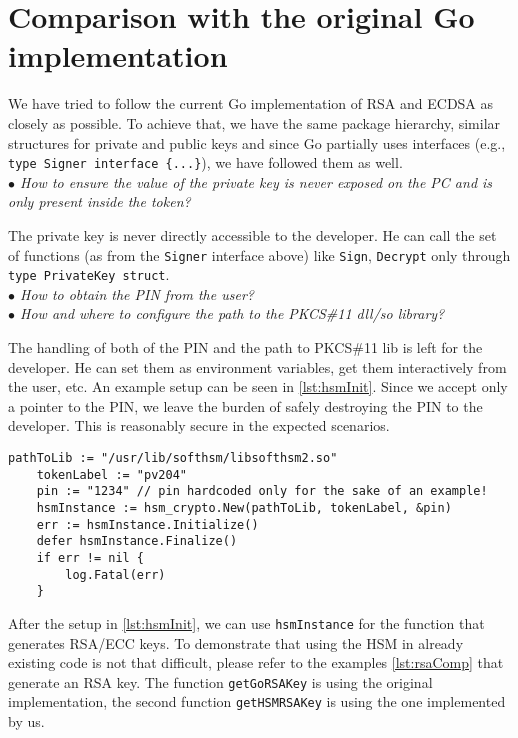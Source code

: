 \documentclass[a4paper]{scrartcl}
\begin{document}
\section{Comparison with the original Go implementation}
We have tried to follow the current Go implementation of RSA and ECDSA as closely as possible. To achieve that, we have the same package hierarchy, similar structures for private and public keys and since Go partially uses interfaces (e.g., \lstinline[columns=fixed]|type Signer interface {...}|), we have followed them as well.\\

\textit{$\bullet$ How to ensure the value of the private key is never exposed on the PC and is only present inside the token?}

The private key is never directly accessible to the developer. He can call the set of functions (as from the \lstinline[columns=fixed]{Signer} interface above) like \lstinline[columns=fixed]{Sign}, \lstinline[columns=fixed]{Decrypt} only through\\ \lstinline[columns=fixed]{type PrivateKey struct}.\\

\textit{$\bullet$ How to obtain the PIN from the user?}\\
\indent\textit{$\bullet$ How and where to configure the path to the PKCS\#11 dll/so library?}

The handling of both of the PIN and the path to PKCS\#11 lib is left for the developer. He can set them as environment variables, get them interactively from the user, etc. An example setup can be seen in \ref{lst:hsmInit}. Since we accept only a pointer to the PIN, we leave the burden of safely destroying the PIN to the developer. This is reasonably secure in the expected scenarios.

\begin{lstlisting}[caption=Comparison of the original and HSM implementations, captionpos=b, label={lst:hsmInit}]
    pathToLib := "/usr/lib/softhsm/libsofthsm2.so"
    tokenLabel := "pv204"
    pin := "1234" // pin hardcoded only for the sake of an example!
    hsmInstance := hsm_crypto.New(pathToLib, tokenLabel, &pin)
    err := hsmInstance.Initialize()
    defer hsmInstance.Finalize()
    if err != nil {
        log.Fatal(err)
    }
\end{lstlisting}

After the setup in \ref{lst:hsmInit}, we can use \lstinline[columns=fixed]{hsmInstance} for the function that generates RSA/ECC keys. To demonstrate that using the HSM in already existing code is not that difficult, please refer to the examples \ref{lst:rsaComp} that generate an RSA key. The function \lstinline[columns=fixed]{getGoRSAKey} is using the original implementation, the second function \lstinline[columns=fixed]{getHSMRSAKey} is using the one implemented by us.
\end{document}
